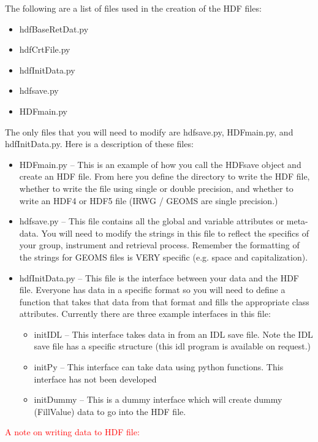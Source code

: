 \documentclass[12pt, letterpaper]{article}
\begin{document}
The following are a list of files used in the creation of the HDF files:

\begin{itemize}
\item hdfBaseRetDat.py
\item hdfCrtFile.py
\item hdfInitData.py
\item hdfsave.py
\item HDFmain.py
\end{itemize}

The only files that you will need to modify are hdfsave.py, HDFmain.py, and hdfInitData.py. Here is a description of these files:

\begin{itemize}
\item HDFmain.py -- This is an example of how you call the HDFsave object and create an HDF file. From here you define the directory to write the HDF file, whether to write the file using single or double precision, and whether to write an HDF4 or HDF5 file (IRWG / GEOMS are single precision.)
\item hdfsave.py -- This file contains all the global and variable attributes or meta-data. You will need to modify the strings in this file to reflect the specifics of your group, instrument and retrieval process. Remember the formatting of the strings for GEOMS files is VERY specific (e.g. space and capitalization).
\item hdfInitData.py -- This file is the interface between your data and the HDF file. Everyone has data in a specific format so you will need to define a function that takes that data from that format and fills the appropriate class attributes. Currently there are three example interfaces in this file:
\begin{itemize}
\item initIDL -- This interface takes data in from an IDL save file. Note the IDL save file has a specific structure (this idl program is available on request.)
\item initPy  -- This interface can take data using python functions. This interface has not been developed
\item initDummy -- This is a dummy interface which will create dummy (FillValue) data to go into the HDF file.
\end{itemize}
\end{itemize} 

\textcolor{red}{A note on writing data to HDF file:}\\
\end{document}
